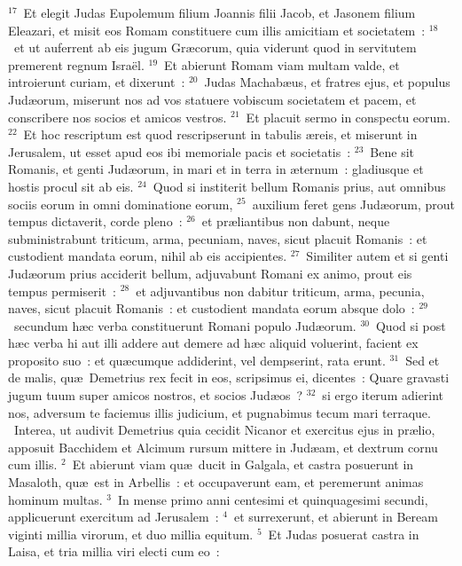 ${}^{17}$~Et elegit Judas Eupolemum filium Joannis filii Jacob, et Jasonem filium Eleazari, et misit eos Romam constituere cum illis amicitiam et societatem~:
${}^{18}$~et ut auferrent ab eis jugum Gr\ae corum, quia viderunt quod in servitutem premerent regnum Isra\"el.
${}^{19}$~Et abierunt Romam viam multam valde, et introierunt curiam, et dixerunt~:
${}^{20}$~Judas Machab\ae us, et fratres ejus, et populus Jud\ae orum, miserunt nos ad vos statuere vobiscum societatem et pacem, et conscribere nos socios et amicos vestros.
${}^{21}$~Et placuit sermo in conspectu eorum.
${}^{22}$~Et hoc rescriptum est quod rescripserunt in tabulis \ae reis, et miserunt in Jerusalem, ut esset apud eos ibi memoriale pacis et societatis~:
${}^{23}$~Bene sit Romanis, et genti Jud\ae orum, in mari et in terra in \ae ternum~: gladiusque et hostis procul sit ab eis.
${}^{24}$~Quod si institerit bellum Romanis prius, aut omnibus sociis eorum in omni dominatione eorum,
${}^{25}$~auxilium feret gens Jud\ae orum, prout tempus dictaverit, corde pleno~:
${}^{26}$~et pr\ae liantibus non dabunt, neque subministrabunt triticum, arma, pecuniam, naves, sicut placuit Romanis~: et custodient mandata eorum, nihil ab eis accipientes.
${}^{27}$~Similiter autem et si genti Jud\ae orum prius acciderit bellum, adjuvabunt Romani ex animo, prout eis tempus permiserit~:
${}^{28}$~et adjuvantibus non dabitur triticum, arma, pecunia, naves, sicut placuit Romanis~: et custodient mandata eorum absque dolo~:
${}^{29}$~secundum h\ae c verba constituerunt Romani populo Jud\ae orum.
${}^{30}$~Quod si post h\ae c verba hi aut illi addere aut demere ad h\ae c aliquid voluerint, facient ex proposito suo~: et qu\ae cumque addiderint, vel dempserint, rata erunt.
${}^{31}$~Sed et de malis, qu\ae\ Demetrius rex fecit in eos, scripsimus ei, dicentes~: Quare gravasti jugum tuum super amicos nostros, et socios Jud\ae os~?
${}^{32}$~si ergo iterum adierint nos, adversum te faciemus illis judicium, et pugnabimus tecum mari terraque.
~Interea, ut audivit Demetrius quia cecidit Nicanor et exercitus ejus in pr\ae lio, apposuit Bacchidem et Alcimum rursum mittere in Jud\ae am, et dextrum cornu cum illis.
${}^{2}$~Et abierunt viam qu\ae\ ducit in Galgala, et castra posuerunt in Masaloth, qu\ae\ est in Arbellis~: et occupaverunt eam, et peremerunt animas hominum multas.
${}^{3}$~In mense primo anni centesimi et quinquagesimi secundi, applicuerunt exercitum ad Jerusalem~:
${}^{4}$~et surrexerunt, et abierunt in Beream viginti millia virorum, et duo millia equitum.
${}^{5}$~Et Judas posuerat castra in Laisa, et tria millia viri electi cum eo~:
